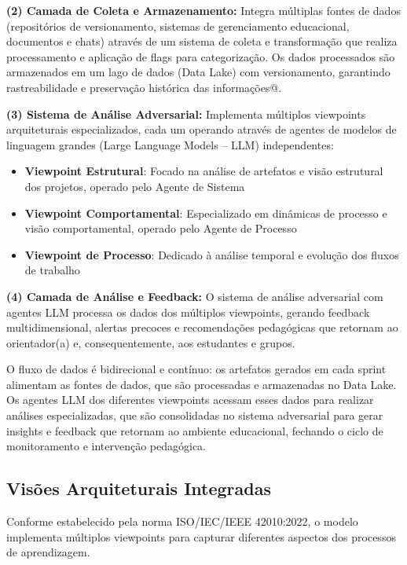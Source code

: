 \documentclass[english, spanish, brazilian]{modelo_dt}
\begin{document}
\textbf{(2) Camada de Coleta e Armazenamento:} Integra múltiplas fontes de dados (repositórios de versionamento, sistemas de gerenciamento educacional, documentos e chats) através de um sistema de coleta e transformação que realiza processamento e aplicação de flags para categorização. Os dados processados são armazenados em um lago de dados (Data Lake) com versionamento, garantindo rastreabilidade e preservação histórica das informações@.

\textbf{(3) Sistema de Análise Adversarial:} Implementa múltiplos viewpoints arquiteturais especializados, cada um operando através de agentes de modelos de linguagem grandes (Large Language Models -- LLM) independentes:
\begin{itemize}
  \item \textbf{Viewpoint Estrutural}: Focado na análise de artefatos e visão estrutural dos projetos, operado pelo Agente de Sistema
  \item \textbf{Viewpoint Comportamental}: Especializado em dinâmicas de processo e visão comportamental, operado pelo Agente de Processo
  \item \textbf{Viewpoint de Processo}: Dedicado à análise temporal e evolução dos fluxos de trabalho
\end{itemize}

\textbf{(4) Camada de Análise e Feedback:} O sistema de análise adversarial com agentes LLM processa os dados dos múltiplos viewpoints, gerando feedback multidimensional, alertas precoces e recomendações pedagógicas que retornam ao orientador(a) e, consequentemente, aos estudantes e grupos\@.

O fluxo de dados é bidirecional e contínuo: os artefatos gerados em cada sprint
alimentam as fontes de dados, que são processadas e armazenadas no Data Lake.
Os agentes LLM dos diferentes viewpoints acessam esses dados para realizar
análises especializadas, que são consolidadas no sistema adversarial para gerar
insights e feedback que retornam ao ambiente educacional, fechando o ciclo de
monitoramento e intervenção pedagógica\@.

\subsection{Visões Arquiteturais Integradas}

Conforme estabelecido pela norma ISO/IEC/IEEE 42010:2022, o modelo implementa
múltiplos viewpoints para capturar diferentes aspectos dos processos de
aprendizagem\@.
\end{document}

